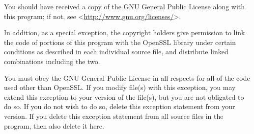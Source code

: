 \documentclass[final,a4paper,11pt,notitlepage,halfparskip]{scrreprt}
\begin{document}
You should have received a copy of the GNU General Public License along with 
this program; if not, see <\url{http://www.gnu.org/licenses/}>.

In addition, as a special exception, the copyright holders give
permission to link the code of portions of this program with the
OpenSSL library under certain conditions as described in each
individual source file, and distribute linked combinations
including the two.

You must obey the GNU General Public License in all respects
for all of the code used other than OpenSSL.  If you modify
file(s) with this exception, you may extend this exception to your
version of the file(s), but you are not obligated to do so.  If you
do not wish to do so, delete this exception statement from your
version.  If you delete this exception statement from all source
files in the program, then also delete it here.
\end{document}
